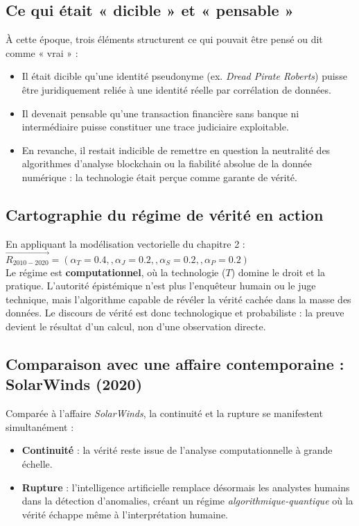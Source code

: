 \documentclass[12pt, a4em]{article}
\begin{document}
	\subsection{ Ce qui était « dicible » et « pensable »}
	
	À cette époque, trois éléments structurent ce qui pouvait être pensé ou dit comme « vrai » :
	\begin{itemize}
		\item Il était dicible qu’une identité pseudonyme (ex. \textit{Dread Pirate Roberts}) puisse être juridiquement reliée à une identité réelle par corrélation de données.
		\item Il devenait pensable qu’une transaction financière sans banque ni intermédiaire puisse constituer une trace judiciaire exploitable.
		\item En revanche, il restait indicible de remettre en question la neutralité des algorithmes d’analyse blockchain ou la fiabilité absolue de la donnée numérique : la technologie était perçue comme garante de vérité.
	\end{itemize}
	
	\subsection{ Cartographie du régime de vérité en action}
	
	En appliquant la modélisation vectorielle du chapitre 2 :\\

	$\vec{R_{2010-2020}} = (\alpha_T = 0.4, , \alpha_J = 0.2, , \alpha_S = 0.2, , \alpha_P = 0.2)$\\
	
	Le régime est \textbf{computationnel}, où la technologie ($T$) domine le droit et la pratique.
	L’autorité épistémique n’est plus l’enquêteur humain ou le juge technique, mais l’algorithme capable de révéler la vérité cachée dans la masse des données.
	Le discours de vérité est donc technologique et probabiliste : la preuve devient le résultat d’un calcul, non d’une observation directe.
	
	\subsection{ Comparaison avec une affaire contemporaine : SolarWinds (2020)}
	
	Comparée à l’affaire \textit{SolarWinds}, la continuité et la rupture se manifestent simultanément :
	\begin{itemize}
		\item \textbf{Continuité} : la vérité reste issue de l’analyse computationnelle à grande échelle.
		\item \textbf{Rupture} : l’intelligence artificielle remplace désormais les analystes humains dans la détection d’anomalies, créant un régime \textit{algorithmique-quantique} où la vérité échappe même à l’interprétation humaine.
	\end{itemize}
	
\end{document}
